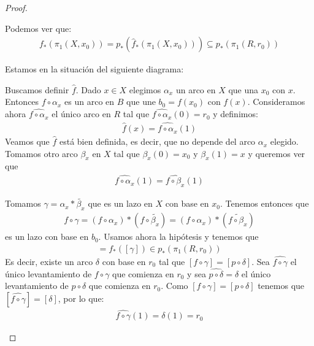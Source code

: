 \begin{teo}
\begin{proof}
\begin{description}
            Podemos ver que:
            \begin{gather*}
                f_*(\pi_1(X,x_0)) = p_*(\hat{f}_*(\pi_1(X,x_0))) \subseteq p_*(\pi_1(R,r_0))
            \end{gather*}

            \item [$(2) \Longrightarrow (1)$:] Estamos en la situación del siguiente diagrama:
            \begin{center}
            \end{center}

            Buscamos definir $\hat{f}$. Dado $x\in X$ elegimos $\alpha_x$ un arco en $X$ que una $x_0$ con $x$. Entonces $f\circ \alpha_x$ es un arco en $B$ que une $b_0 = f(x_0)$ con $f(x)$. Consideramos ahora $\widehat{f\circ \alpha_x}$ el único arco en $R$ tal que $\widehat{f\circ \alpha_x}(0) = r_0$ y definimos:
            \begin{gather*}
                \hat{f}(x) = \widehat{f\circ \alpha_x}(1)
            \end{gather*}
            Veamos que $\hat{f}$ está bien definida, es decir, que no depende del arco $\alpha_x$ elegido. Tomamos otro arco $\beta_x$ en $X$ tal que $\beta_x(0)=x_0$ y $\beta_x(1)=x$ y queremos ver que
            \begin{gather*}
                \widehat{f\circ \alpha_x}(1) = \widehat{f\circ \beta_x}(1)
            \end{gather*}

            Tomamos $\gamma=\alpha_x \ast \tilde{\beta_x}$ que es un lazo en $X$ con base en $x_0$. Tenemos entonces que 
            \begin{gather*}
                f \circ \gamma = (f\circ \alpha_x) \ast (f \circ \tilde{\beta_x}) = (f\circ \alpha_x) \ast (\tilde{f \circ \beta_x})
            \end{gather*}
            es un lazo con base en $b_0$. Usamos ahora la hipótesis y tenemos que 
            \begin{gather*}
                [f\circ \gamma] = f_*([\gamma]) \in p_*(\pi_1(R, r_0))
            \end{gather*}
            Es decir, existe un arco $\delta$ con base en $r_0$ tal que $[f\circ \gamma] = [p\circ \delta]$. Sea $\widehat{f\circ \gamma}$ el único levantamiento de $f\circ \gamma$ que comienza en $r_0$ y sea $\widehat{p\circ \delta}=\delta$ el único levantamiento de $p\circ \delta$ que comienza en $r_0$. Como $[f\circ \gamma] = [p\circ \delta]$ tenemos que $[\widehat{f\circ \gamma}] = [\delta]$, por lo que:
            \begin{gather*}
                \widehat{f\circ \gamma}(1) = \delta(1) = r_0
            \end{gather*}


\end{description}
\end{proof}
\end{teo}
